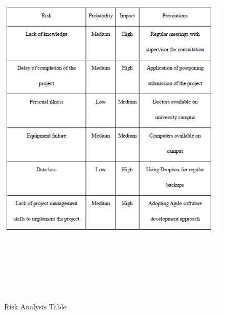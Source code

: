 \begin{figure}[H]
	\centering	
	\includegraphics[width=15cm, height=18cm]{Figs/Risk-Analysis}\\[1ex]
	\caption{Risk Analysis Table }
	\label{fig:riskAnalysis}
\end{figure}

